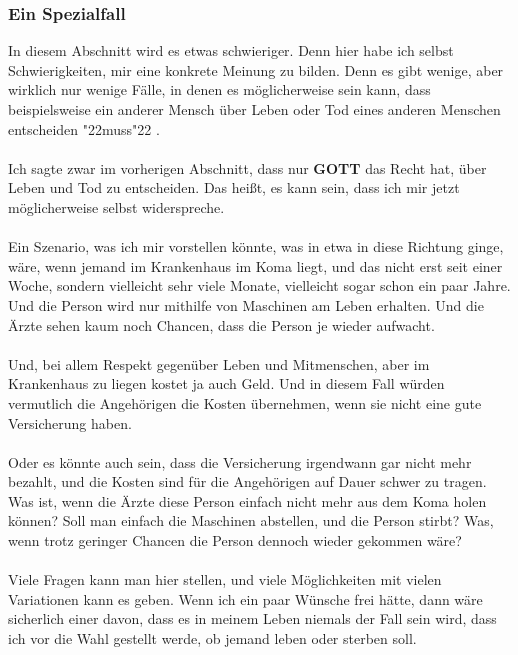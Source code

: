 \documentclass[12pt,a5paper]{article}
\newcommand{\Gott}[0]{\textbf{GOTT}}
\newcommand{\q}[1]{\char"22{#1}\char"22 }
\begin{document}
	\subsubsection{Ein Spezialfall}
		In diesem Abschnitt wird es etwas schwieriger.
		Denn hier habe ich selbst Schwierigkeiten,
		mir eine konkrete Meinung zu bilden.
		Denn es gibt wenige,
		aber wirklich nur wenige F\"alle,
		in denen es m\"oglicherweise sein kann,
		dass beispielsweise ein anderer Mensch \"uber Leben oder Tod eines anderen Menschen entscheiden \q{muss}.
		\\
		\\
		Ich sagte zwar im vorherigen Abschnitt,
		dass nur {\Gott} das Recht hat,
		\"uber Leben und Tod zu entscheiden.
		Das hei{\ss}t,
		es kann sein,
		dass ich mir jetzt m\"oglicherweise selbst widerspreche.
		\\
		\\
		Ein Szenario,
		was ich mir vorstellen k\"onnte,
		was in etwa in diese Richtung ginge,
		w\"are,
		wenn jemand im Krankenhaus im Koma liegt,
		und das nicht erst seit einer Woche,
		sondern vielleicht sehr viele Monate,
		vielleicht sogar schon ein paar Jahre.
		Und die Person wird nur mithilfe von Maschinen am Leben erhalten.
		Und die \"Arzte sehen kaum noch Chancen,
		dass die Person je wieder aufwacht.
		\\
		\\
		Und,
		bei allem Respekt gegen\"uber Leben und Mitmenschen,
		aber im Krankenhaus zu liegen kostet ja auch Geld.
		Und in diesem Fall w\"urden vermutlich die Angeh\"origen die Kosten \"ubernehmen,
		wenn sie nicht eine gute Versicherung haben.
		\\
		\\
		Oder es k\"onnte auch sein,
		dass die Versicherung irgendwann gar nicht mehr bezahlt,
		und die Kosten sind f\"ur die Angeh\"origen auf Dauer schwer zu tragen.
		Was ist,
		wenn die \"Arzte diese Person einfach nicht mehr aus dem Koma holen k\"onnen?
		Soll man einfach die Maschinen abstellen,
		und die Person stirbt?
		Was,
		wenn trotz geringer Chancen die Person dennoch wieder gekommen w\"are?
		\\
		\\
		Viele Fragen kann man hier stellen,
		und viele M\"oglichkeiten mit vielen Variationen kann es geben.
		Wenn ich ein paar W\"unsche frei h\"atte,
		dann w\"are sicherlich einer davon,
		dass es in meinem Leben niemals der Fall sein wird,
		dass ich vor die Wahl gestellt werde,
		ob jemand leben oder sterben soll.
		
\end{document}
